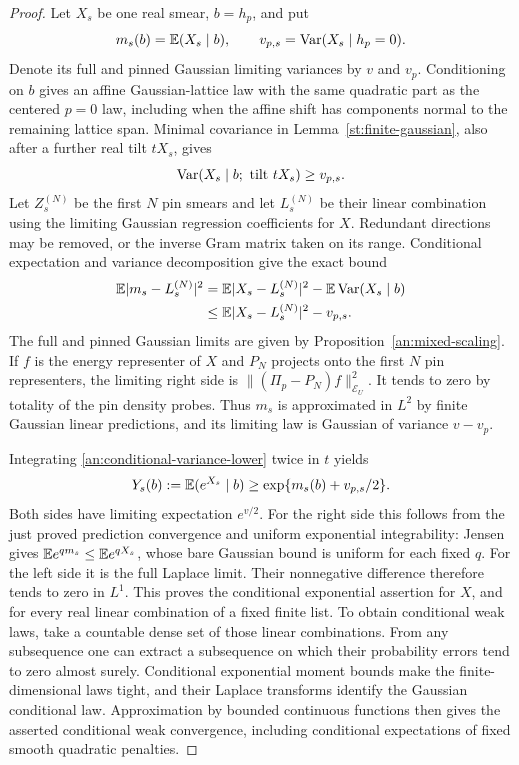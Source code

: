 \begin{proof}
Let $X_s$ be one real smear, $b=h_p$, and put
\[
 m_s(b)=\mathbb E(X_s\mid b),\qquad
 v_{p,s}=\operatorname{Var}(X_s\mid h_p=0).
\]
Denote its full and pinned Gaussian limiting variances
by $v$ and $v_p$.  Conditioning on $b$ gives an
affine Gaussian-lattice law with the same quadratic
part as the centered $p=0$ law, including when
the affine shift has components normal to the
remaining lattice span.  Minimal covariance in
Lemma~\ref{st:finite-gaussian}, also after a
further real tilt $tX_s$, gives
\begin{equation}
 \operatorname{Var}(X_s\mid b;\text{ tilt }tX_s)\ge v_{p,s}.
 \label{an:conditional-variance-lower}
\end{equation}
Let $Z_s^{(N)}$ be the first $N$ pin smears and
let $L_s^{(N)}$ be their linear combination
using the limiting Gaussian regression
coefficients for $X$.  Redundant directions
may be removed, or the inverse Gram matrix
taken on its range.  Conditional expectation
and variance decomposition give the exact
bound
\begin{align}
 \mathbb E|m_s-L_s^{(N)}|^2
 &=\mathbb E|X_s-L_s^{(N)}|^2
                          -\mathbb E\operatorname{Var}(X_s\mid b)\notag\\
 &\le\mathbb E|X_s-L_s^{(N)}|^2-v_{p,s}.
 \label{an:regression-saturation}
\end{align}
The full and pinned Gaussian limits are
given by Proposition~\ref{an:mixed-scaling}.
If $f$ is the energy representer of $X$
and $P_N$ projects onto the first $N$
pin representers, the limiting right
side is
$\|(\Pi_p-P_N)f\|_{\mathcal E_U}^2$.
It tends to zero by totality of the pin
density probes.  Thus $m_s$ is
approximated in $L^2$ by finite Gaussian
linear predictions, and its limiting
law is Gaussian of variance $v-v_p$.

Integrating \eqref{an:conditional-variance-lower}
twice in $t$ yields
\begin{equation}
 Y_s(b):=\mathbb E(e^{X_s}\mid b)
           \ge\exp\{m_s(b)+v_{p,s}/2\}.
 \label{an:conditional-exp-lower}
\end{equation}
Both sides have limiting expectation
$e^{v/2}$.  For the right side this
follows from the just proved prediction
convergence and uniform exponential
integrability: Jensen gives
$\mathbb E e^{q m_s}\le\mathbb E e^{qX_s}$, whose
bare Gaussian bound is uniform for
each fixed $q$.  For the left side
it is the full Laplace limit.  Their
nonnegative difference therefore tends
to zero in $L^1$.  This proves the
conditional exponential assertion for
$X$, and for every real linear
combination of a fixed finite list.
To obtain conditional weak laws,
take a countable dense set of those
linear combinations.  From any
subsequence one can extract a
subsequence on which their probability
errors tend to zero almost surely.
Conditional exponential moment bounds
make the finite-dimensional laws
tight, and their Laplace transforms
identify the Gaussian conditional
law.  Approximation by bounded
continuous functions then gives
the asserted conditional weak
convergence, including conditional
expectations of fixed smooth
quadratic penalties.


\end{proof}
